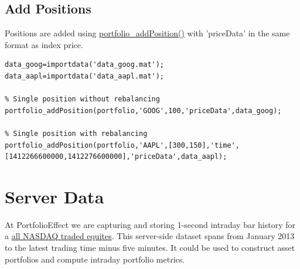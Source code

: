 \documentclass[letterpaper]{report}
\newcounter{N}
\begin{document}
\subsection {Add Positions}
Positions are added using 
\href{https://www.portfolioeffect.com/docs/platform/quant/functions/general-functions/portfolio-add-position}{portfolio\_addPosition()}
with 'priceData' in the same format as index price.
\begin{lstlisting}
data_goog=importdata('data_goog.mat');
data_aapl=importdata('data_aapl.mat');

% Single position without rebalancing
portfolio_addPosition(portfolio,'GOOG',100,'priceData',data_goog); 

% Single position with rebalancing
portfolio_addPosition(portfolio,'AAPL',[300,150],'time',[1412266600000,1412276600000],'priceData',data_aapl); 
\end{lstlisting}

\section{Server Data}
At PortfolioEffect we are capturing and storing 1-second intraday bar history for a 
\href{https://www.portfolioeffect.com/docs/symbology}{all NASDAQ traded equites}.
This server-side dataset spans from January 2013 to the latest trading time minus five minutes. 
It could be used to construct asset portfolios and compute intraday portfolio metrics.
\end{document}
